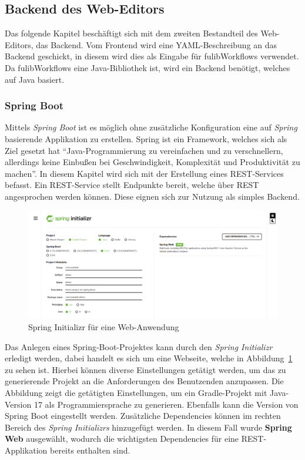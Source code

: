 \subsection{Backend des Web-Editors}\label{subsec:backend}
Das folgende Kapitel beschäftigt sich mit dem zweiten Bestandteil des Web-Editors, das Backend.
Vom Frontend wird eine YAML-Beschreibung an das Backend geschickt, in diesem wird dies als Eingabe für fulibWorkflows verwendet.
Da fulibWorkflows eine Java-Bibliothek ist, wird ein Backend benötigt, welches auf Java basiert.

\subsubsection{Spring Boot}
Mittels \textit{Spring Boot} ist es möglich ohne zusätzliche Konfiguration eine auf \textit{Spring} basierende Applikation zu erstellen\cite*{springBoot}.
Spring ist ein Framework, welches sich als Ziel gesetzt hat ``Java-Programmierung zu vereinfachen und zu verschnellern, allerdings keine Einbußen
bei Geschwindigkeit, Komplexität und Produktivität zu machen''\cite*{spring}.
In diesem Kapitel wird sich mit der Erstellung eines REST-Services befasst.
Ein REST-Service stellt Endpunkte bereit, welche über REST angesprochen werden können.
Diese eignen sich zur Nutzung als simples Backend.

\begin{figure}[h]
    \centering
    \includegraphics[width=1.0\textwidth]{images/2.2/spring-init}
    \caption{Spring Initializr für eine Web-Anwendung}
    \label{fig:spring-init}
\end{figure}


Das Anlegen eines Spring-Boot-Projektes kann durch den \textit{Spring Initializr} erledigt werden, dabei handelt es sich um eine Webseite, welche in
Abbildung~\ref{fig:spring-init} zu sehen ist\cite*{sbinit}.
Hierbei können diverse Einstellungen getätigt werden, um das zu generierende Projekt an die Anforderungen des Benutzenden anzupassen.
Die Abbildung zeigt die getätigten Einstellungen, um ein Gradle-Projekt mit Java-Version 17 als Programmiersprache zu generieren.
Ebenfalls kann die Version von Spring Boot eingestellt werden.
Zusätzliche Dependencies können im rechten Bereich des \textit{Spring Initializrs} hinzugefügt werden.
In diesem Fall wurde \textbf{Spring Web} ausgewählt, wodurch die wichtigsten Dependencies für eine REST-Applikation bereits enthalten sind.

